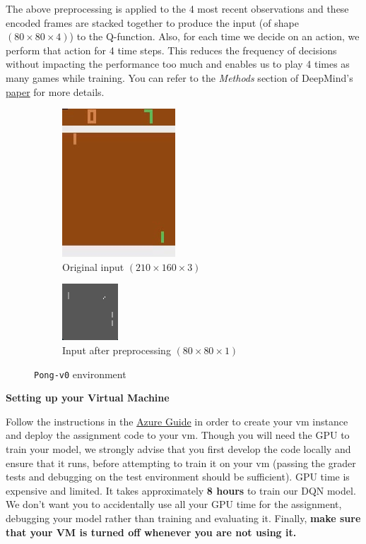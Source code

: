 The above preprocessing is applied to the 4 most recent observations and these encoded frames are stacked together to produce the input (of shape $(80 \times 80 \times 4)$) to the Q-function. Also, for each time we decide on an action, we perform that action for 4 time steps. This reduces the frequency of decisions without impacting the performance too much and enables us to play 4 times as many games while training. You can refer to the \textit{Methods} section of DeepMind's \href{https://storage.googleapis.com/deepmind-media/dqn/DQNNaturePaper.pdf}{paper} for more details. \\

\begin{figure}[H]
\centering
\begin{subfigure}[b]{.4\textwidth}
  \centering
  \includegraphics[width=.25\linewidth]{images/pong}
  \caption{Original input $ (210 \times 160 \times 3)$ }
  \label{fig:pong}
\end{subfigure}
\begin{subfigure}[b]{.4\textwidth}
  \centering
  \includegraphics[width=.25\linewidth]{images/pong_grey}
  \caption{Input after preprocessing $ (80 \times 80 \times 1 ) $}
  \label{fig:pong_grey}
\end{subfigure}
\caption{\texttt{Pong-v0} environment}
\label{fig:pong_env}
\end{figure}

\textbf{Setting up your Virtual Machine}

Follow the instructions in the \href{https://github.com/scpd-proed/XCS234-Handouts/blob/main/Azure/Azure%20Guide.pdf}{Azure Guide} in order to create your vm instance and deploy the assignment code to your vm. Though you will need the GPU to train your model, we strongly advise that you first develop the code locally and ensure that it runs, before attempting to train it on your vm (passing the grader tests and debugging on the test environment should be sufficient). GPU time is expensive and limited. It takes approximately \textbf{8 hours} to train our DQN model. We don't want you to accidentally use all your GPU time for the assignment, debugging your model rather than training and evaluating it. Finally, \textbf{make sure that your VM is turned off whenever you are not using it.}

